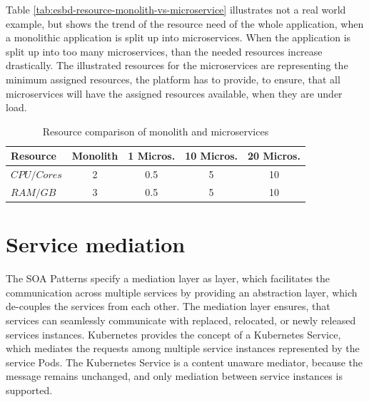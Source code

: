 Table \vref{tab:esbd-resource-monolith-vs-microservice} illustrates not a real world example, but shows the trend of the resource need of the whole application, when a monolithic application is split up into microservices. When the application is split up into too many microservices, than the needed resources increase drastically. The illustrated resources for the microservices are representing the minimum assigned resources, the platform has to provide, to ensure, that all microservices will have the assigned resources available, when they are under load.

{\renewcommand{\arraystretch}{1.2}%
%
	\begin{table}[h]
		\begin{tabularx}{\textwidth}{ m|c|c|c|c }	
			\textbf{Resource}    & \textbf{Monolith} & \textbf{1 Micros.} & \textbf{10 Micros.} & \textbf{20 Micros.} \\  \hline
			\textit{$CPU/Cores$} & 2                 & 0.5                & 5                   & 10 \\
			\textit{$RAM/GB$}    & 3                 & 0.5                & 5                   & 10 \\ \hline
		\end{tabularx}
		\caption{Resource comparison of monolith and microservices}
		\label{tab:esbd-resource-monolith-vs-microservice}
\end{table}}

\section{Service mediation}
\label{sec:esbd-service-mediation}
The SOA Patterns specify a mediation layer as layer, which facilitates the communication across multiple services by providing an abstraction layer, which de-couples the services from each other. The mediation layer ensures, that services can seamlessly communicate with replaced, relocated, or newly released services instances. Kubernetes provides the concept of a Kubernetes Service, which mediates the requests among multiple service instances represented by the service Pods. The Kubernetes Service is a content unaware mediator, because the message remains unchanged, and only mediation between service instances is supported.

